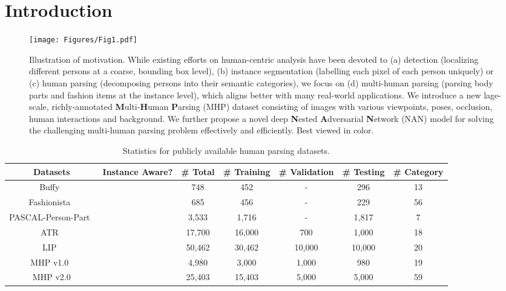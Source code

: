 \documentclass[10pt,twocolumn,letterpaper]{article}
\newcommand{\cmark}{\ding{51}}%
\newcommand{\xmark}{\ding{55}}%
\theoremstyle{definition}
\theoremstyle{remark}
\begin{document}
\section{Introduction}

\begin{figure}[t]
	\begin{center}
		\texttt{[image: Figures/Fig1.pdf]}
	\end{center}
	\vspace{-5mm}
	\small
	\caption{\small Illustration of motivation. While existing efforts on human-centric analysis have been devoted to (a) detection (localizing different persons at a coarse, bounding box level), (b) instance segmentation (labelling each pixel of each person uniquely) or (c) human parsing (decomposing persons into their semantic categories), we focus on (d) multi-human parsing (parsing body parts and fashion items at the instance level), which aligns better with many real-world applications. We introduce a new lage-scale, richly-annotated \textbf{M}ulti-\textbf{H}uman \textbf{P}arsing (MHP) dataset consisting of images with various viewpoints, poses, occlusion, human interactions and background. We further propose a novel deep \textbf{N}ested \textbf{A}dversarial \textbf{N}etwork (NAN) model for solving the challenging multi-human parsing problem effectively and efficiently. Best viewed in color.}
	\label{fig: Fig1}
	\vspace{-2mm}
\end{figure}

\begin{table*}[t]
	\newcommand{\tabincell}[2]{\begin{tabular}{@{}#1@{}}#2\end{tabular}}
	\begin{center}
		\scriptsize
		\caption{\small Statistics for publicly available human parsing datasets.}
		\label{tab: Tab1}
		\vspace{-3mm}
		\begin{tabular}{ccccccc}
			\hline{Datasets} & {Instance Aware?} & {\# Total} & {\# Training} & {\# Validation} & {\# Testing} & {\# Category} \\
			\hline
			Buffy~\cite{vineet2011human} & \cmark & 748 & 452 & - & 296 & 13 \\
			Fashionista~\cite{yamaguchi2012parsing} & \xmark & 685 & 456 & - & 229 & 56 \\
			PASCAL-Person-Part~\cite{chen2014detect} & \xmark & 3{,}533 & 1{,}716 & - & 1{,}817 & 7 \\
			ATR~\cite{liang2015human} & \xmark & 17{,}700 & 16{,}000 & 700 & 1{,}000 & 18 \\
			LIP~\cite{gong2017look} & \xmark & 50{,}462 & 30{,}462 & 10{,}000 & 10{,}000 & 20 \\
			MHP v1.0~\cite{li2017towards} & \cmark & 4{,}980 & 3{,}000 & 1{,}000 & 980 & 19 \\
			\hline
			MHP v2.0 & \cmark & 25{,}403 & 15{,}403 & 5{,}000 & 5{,}000 & 59 \\			
			\hline
		\end{tabular}
	\end{center}
	\vspace{-6mm}
\end{table*}
\end{document}
